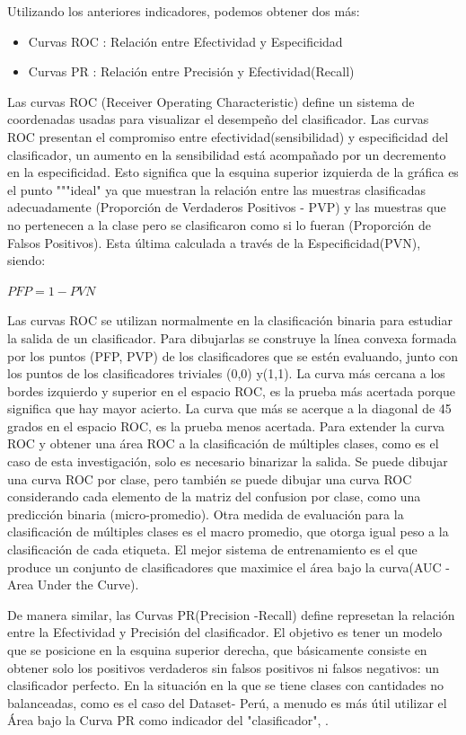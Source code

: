 	Utilizando los anteriores indicadores, podemos obtener dos más:
	\begin{itemize}
		\item Curvas ROC : Relación entre Efectividad y Especificidad
		\item Curvas PR  : Relación entre Precisión y Efectividad(Recall)
	\end{itemize}

	
	Las curvas ROC (Receiver Operating Characteristic) define un sistema de coordenadas usadas para visualizar el desempeño del clasificador. Las curvas ROC presentan el compromiso entre efectividad(sensibilidad) y especificidad del clasificador, un aumento en la sensibilidad está acompañado por un decremento en la especificidad. Esto significa que la esquina superior izquierda de la gráfica es el punto """ideal" ya que muestran la relación entre las muestras clasificadas adecuadamente (Proporción de Verdaderos Positivos - PVP) y las muestras que no pertenecen a la clase pero se clasificaron como si lo fueran (Proporción de Falsos Positivos). Esta última calculada a través de la Especificidad(PVN), siendo:
	\begin{center}
	{$PFP= 1 - PVN$}
	\end{center}

	Las curvas ROC se utilizan normalmente en la clasificación binaria para estudiar la salida de un clasificador. Para dibujarlas se construye la línea convexa formada por los puntos (PFP, PVP) de los clasificadores que se estén evaluando, junto con los puntos de los clasificadores triviales (0,0) y(1,1). La curva más cercana a los bordes izquierdo y superior en el espacio ROC, es la prueba más acertada porque significa que hay mayor acierto. La curva que más se acerque a la diagonal de 45 grados en el espacio ROC, es la prueba menos acertada. Para extender la curva ROC y obtener una área ROC a la clasificación de múltiples clases, como es el caso de esta investigación, solo es necesario binarizar la salida. Se puede dibujar una curva ROC por clase, pero también se puede dibujar una curva ROC considerando cada elemento de la matriz del confusion por clase, como una predicción binaria (micro-promedio). Otra medida de evaluación para la clasificación de múltiples clases es el macro promedio, que otorga igual peso a la clasificación de cada etiqueta. El mejor sistema de entrenamiento es el que produce un conjunto de clasificadores que maximice el área bajo la curva(AUC - Area Under the Curve)\citep{SandovalCereza}.


	De manera similar, las Curvas PR(Precision -Recall) define represetan la relación entre la Efectividad y Precisión del clasificador. El objetivo es tener un modelo que se posicione en la esquina superior derecha, que básicamente consiste en obtener solo los positivos verdaderos sin falsos positivos ni falsos negativos: un clasificador perfecto. En la situación en la que se tiene clases con cantidades no balanceadas, como es el caso del Dataset- Perú, a menudo es más útil utilizar el Área bajo la Curva PR como indicador del "clasificador", \citep{Davis-2006-RPR-1143844-1143874}.


